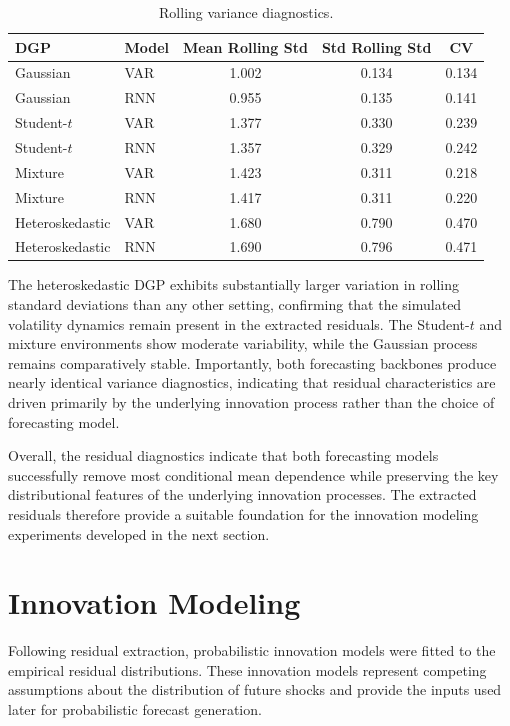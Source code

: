 \documentclass[11pt]{article}
\begin{document}
\begin{table}[H]
\centering
\caption{Rolling variance diagnostics.}
\label{tab:variance_summary}
\begin{tabular}{llccc}
\toprule
DGP & Model & Mean Rolling Std & Std Rolling Std & CV \\
\midrule
Gaussian & VAR & 1.002 & 0.134 & 0.134 \\
Gaussian & RNN & 0.955 & 0.135 & 0.141 \\

Student-$t$ & VAR & 1.377 & 0.330 & 0.239 \\
Student-$t$ & RNN & 1.357 & 0.329 & 0.242 \\

Mixture & VAR & 1.423 & 0.311 & 0.218 \\
Mixture & RNN & 1.417 & 0.311 & 0.220 \\

Heteroskedastic & VAR & 1.680 & 0.790 & 0.470 \\
Heteroskedastic & RNN & 1.690 & 0.796 & 0.471 \\
\bottomrule
\end{tabular}
\end{table}

The heteroskedastic DGP exhibits substantially larger variation in rolling standard deviations than any other setting, confirming that the simulated volatility dynamics remain present in the extracted residuals. The Student-\(t\) and mixture environments show moderate variability, while the Gaussian process remains comparatively stable. Importantly, both forecasting backbones produce nearly identical variance diagnostics, indicating that residual characteristics are driven primarily by the underlying innovation process rather than the choice of forecasting model.

Overall, the residual diagnostics indicate that both forecasting models successfully remove most conditional mean dependence while preserving the key distributional features of the underlying innovation processes. The extracted residuals therefore provide a suitable foundation for the innovation modeling experiments developed in the next section.
\section{Innovation Modeling}

Following residual extraction, probabilistic innovation models were fitted to the empirical residual distributions. These innovation models represent competing assumptions about the distribution of future shocks and provide the inputs used later for probabilistic forecast generation.
\end{document}
